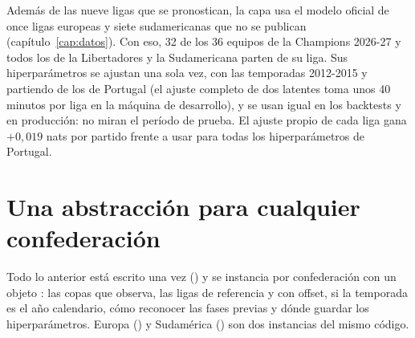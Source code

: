 Además de las nueve ligas que se pronostican, la capa usa el modelo oficial de once ligas europeas y siete sudamericanas que no se publican (capítulo~\ref{cap:datos}). Con eso, 32 de los 36 equipos de la Champions 2026-27 y todos los de la Libertadores y la Sudamericana parten de su liga. Sus hiperparámetros se ajustan una sola vez, con las temporadas 2012-2015 y partiendo de los de Portugal (el ajuste completo de dos latentes toma unos 40 minutos por liga en la máquina de desarrollo), y se usan igual en los backtests y en producción: no miran el período de prueba. El ajuste propio de cada liga gana $+0{,}019$ nats por partido frente a usar para todas los hiperparámetros de Portugal.

\section{Una abstracción para cualquier confederación}

Todo lo anterior está escrito una vez () y se instancia por confederación con un objeto : las copas que observa, las ligas de referencia y con offset, si la temporada es el año calendario, cómo reconocer las fases previas y dónde guardar los hiperparámetros. Europa () y Sudamérica () son dos instancias del mismo código.
